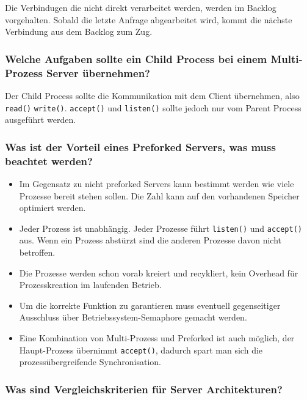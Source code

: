 \documentclass[10pt,a4paper]{scrartcl}
\begin{document}
Die Verbindugen die nicht direkt verarbeitet werden, werden im Backlog vorgehalten. Sobald die
letzte Anfrage abgearbeitet wird, kommt die nächste Verbindung aus dem Backlog zum Zug.
  
\subsubsection{Welche Aufgaben sollte ein Child Process bei einem Multi-Prozess Server übernehmen?}

Der Child Process sollte die Kommunikation mit dem Client übernehmen, also \texttt{read()}
\texttt{write()}. \texttt{accept()} und \texttt{listen()} sollte jedoch nur vom Parent Process
ausgeführt werden.
  
\subsubsection{Was ist der Vorteil eines Preforked Servers, was muss beachtet werden?}

\begin{itemize}
	\item Im Gegensatz zu nicht preforked Servers kann bestimmt werden wie viele Prozesse bereit
		stehen sollen. Die Zahl kann auf den vorhandenen Speicher optimiert werden.
	\item Jeder Prozess ist unabhängig. Jeder Prozesse führt \texttt{listen()} und \texttt{accept()}
		aus.  Wenn ein Prozess abstürzt sind die anderen Prozesse davon nicht betroffen.
	\item Die Prozesse werden schon vorab kreiert und recykliert, kein Overhead für Prozesskreation im
		laufenden Betrieb.
	\item Um die korrekte Funktion zu garantieren muss eventuell gegenseitiger Ausschluss über
		Betriebssystem-Semaphore gemacht werden.
	\item Eine Kombination von Multi-Prozess und Preforked ist auch möglich, der Haupt-Prozess
		übernimmt \texttt{accept()}, dadurch spart man sich die prozessübergreifende Synchronisation.
\end{itemize}

\subsubsection{Was sind Vergleichskriterien für Server Architekturen?}
\end{document}
